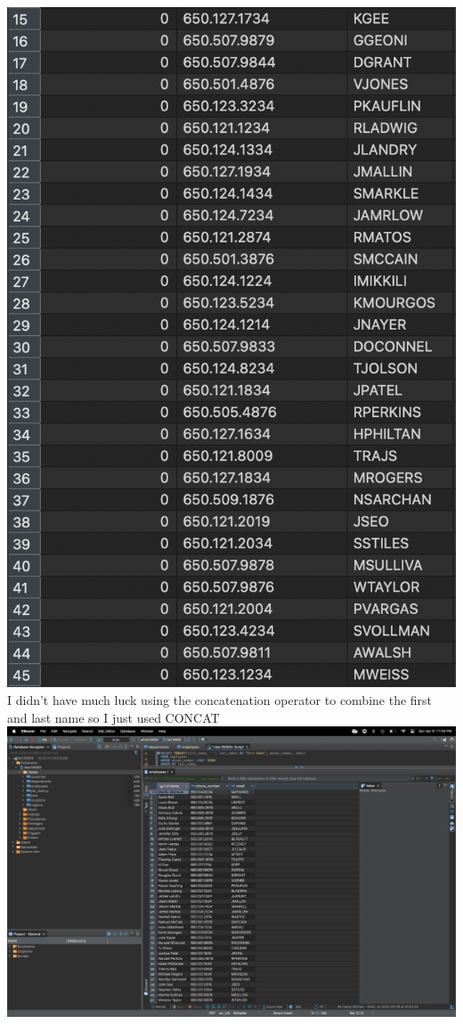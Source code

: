\documentclass{article}
\begin{document}
\begin{enumerate}
\begin{center}
        \includegraphics*[scale=.16]{10.2.png}
        \\
        I didn't have much luck using the concatenation operator to combine the first and last name so I just used CONCAT
        \includegraphics*[scale=.16]{10.3.png}

\end{center}
\end{enumerate}
\end{document}
